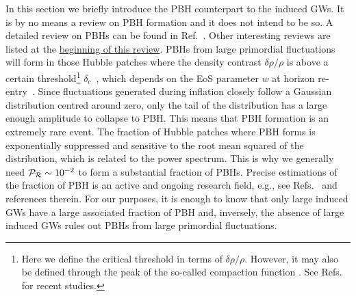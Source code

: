 \documentclass[a4paper,11pt]{article}
\numberwithin{equation}{section}
\begin{document}
In this section we briefly introduce the PBH counterpart to the induced GWs. It is by no means a review on PBH formation and it does not intend to be so. A detailed review on PBHs can be found in Ref.~\cite{Sasaki:2018dmp}. Other interesting reviews are listed at the \hyperref[sec:structure]{beginning of this review}. PBHs from large primordial fluctuations will form in those Hubble patches where the density contrast $\delta\rho/\rho$ is above a certain threshold\footnote{Here we define the critical threshold in terms of $\delta\rho/\rho$. However, it may also be defined through the peak of the so-called compaction function \cite{Shibata:1999zs}. See Refs.~\cite{Nakama:2013ica,Harada:2015yda,Escriva:2021pmf} for recent studies.} $\delta_c$~\cite{Zeldovich:1967lct,Hawking:1971ei,Carr:1974nx,Meszaros:1974tb,Carr:1975qj,Khlopov:1985jw,Niemeyer:1999ak}, which depends on the EoS parameter $w$ at horizon re-entry~\cite{Musco:2004ak,Musco:2008hv,Musco:2012au,Harada:2013epa,Escriva:2019phb,Musco:2020jjb,Young:2020xmk,Escriva:2020tak}. Since fluctuations generated during inflation closely follow a Gaussian distribution centred around zero, only the tail of the distribution has a large enough amplitude to collapse to PBH. This means that PBH formation is an extremely rare event. The fraction of Hubble patches where PBH forms is exponentially suppressed and sensitive to the root mean squared of the distribution, which is related to the power spectrum. This is why we generally need ${\cal P}_{\cal R}\sim 10^{-2}$ to form a substantial fraction of PBHs. Precise estimations of the fraction of PBH is an active and ongoing research field, e.g., see Refs.~\cite{Kehagias:2019eil,Atal:2019erb,Yoo:2019pma,Riccardi:2021rlf,Young:2019yug,Musco:2020jjb,Young:2020xmk,Escriva:2020tak,Escriva:2021pmf} and references therein. For our purposes, it is enough to know that only large induced GWs have a large associated fraction of PBH and, inversely, the absence of large induced GWs rules out PBHs from large primordial fluctuations.
\end{document}
